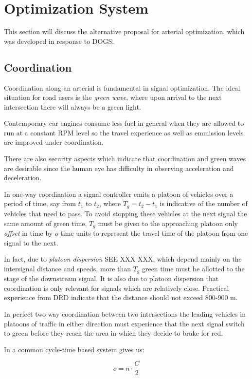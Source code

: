 \section{Optimization System}
\label{optimization}
This section will discuss the alternative proposal for arterial optimization, which was developed in response to DOGS.

\subsection{Coordination}
\label{coordination}
Coordination along an arterial is fundamental in signal optimization. The ideal situation for road users is the \textit{green wave}, where upon arrival to the next intersection there will always be a green light.

Contemporary car engines consume less fuel in general when they are allowed to run at a constant RPM level so the travel experience as well as emmission levels are improved under coordination.

There are also security aspects which indicate that coordination and green waves are desirable since the human eye has difficulty in observing acceleration and deceleration.

In one-way coordination a signal controller emits a platoon of vehicles over a period of time, say from $t_1$ to $t_2$, where $T_g = t_2 - t_1$ is indicative of the number of vehicles that need to pass. To avoid stopping these vehicles at the next signal the same amount of green time, $T_g$ must be given to the approaching platoon only \textit{offset} in time by $o$ time units to represent the travel time of the platoon from one signal to the next. 

In fact, due to \textit{platoon dispersion} SEE XXX XXX, which depend mainly on the intersignal distance and speeds, more than $T_g$ green time must be allotted to the stage of the downstream signal. It is also due to platoon dispersion that coordination is only relevant for signals which are relatively close. Practical experience from DRD indicate that the distance should not exceed 800-900 m. 

In perfect two-way coordination between two intersections the leading vehicles in platoons of traffic in either direction must experience that the next signal switch to green before they reach the area in which they decide to brake for red.

In a common cycle-time based system \cite{coord} gives us:

$$o = n \cdot \frac{C}{2}$$

